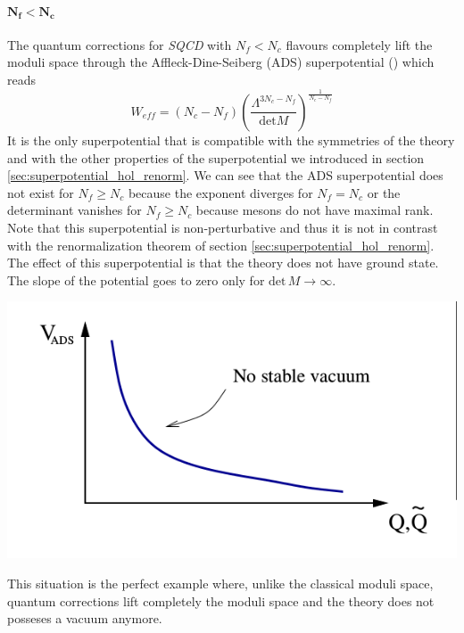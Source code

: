 \paragraph{$\mathbf{ N_f < N_c}$}
The quantum corrections for \emph{SQCD} with $N_f < N_c$ flavours completely lift the moduli space through the Affleck-Dine-Seiberg (ADS) superpotential (\cite{Davis:1983mz}\cite{Affleck:1983mk}) which reads
\begin{equation}
W_{eff} = \left( N_c - N_f  \right)\left( 
\frac{\Lambda^{3N_c -  N_f }}
{\mathrm{det} {M}}
\right)^{ \frac{1}{N_c - N_f}}
\end{equation}
It is the only superpotential that is compatible with the symmetries of the theory and with the other properties of the superpotential we introduced in section \ref{sec:superpotential_hol_renorm}.
We can see that the ADS superpotential does not exist for $N_f \geq N_c$ because the exponent diverges for $N_f = N_c$ or the determinant vanishes for $N_f \ge N_c$ because mesons do not have maximal rank.
Note that this superpotential is non-perturbative and thus it is not in contrast with the renormalization theorem of section \ref{sec:superpotential_hol_renorm}.
The effect of this superpotential is that the theory does not have ground state.
The slope of the potential goes to zero only for $\mathrm{det} \, {M}  \rightarrow \infty $.
\begin{center}
\includegraphics[scale=0.5]{ads_super.png}
\end{center}
This situation is the perfect example where, unlike the classical moduli space, quantum corrections lift completely the moduli space and the theory does not posseses a vacuum anymore.

